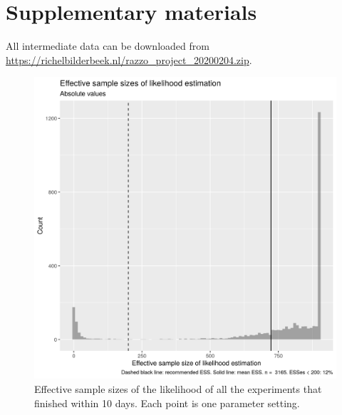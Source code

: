 \section{Supplementary materials}

All intermediate data can be downloaded from \url{https://richelbilderbeek.nl/razzo_project_20200204.zip}.


\begin{figure}[!htbp]
  \includegraphics[width=\textwidth]{20200204_fig_esses.png}
  \caption{
    Effective sample sizes of the likelihood of all the experiments that
    finished within 10 days. 
    Each point is one parameter setting.
  }
  \label{fig:esses}
\end{figure}


